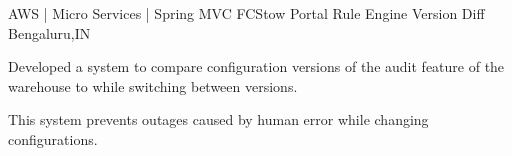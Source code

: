 \begin{cventries}

\cventry
{AWS | Micro Services | Spring MVC} %
{FCStow Portal Rule Engine Version Diff} %
{Bengaluru,IN} %
{} %
{ %
\begin{cvitems}
\item {Developed a system to compare configuration versions of the audit feature of the warehouse to while switching between versions.}
\item {This system prevents outages caused by human error while changing configurations.}
\end{cvitems}
}






\end{cventries}
